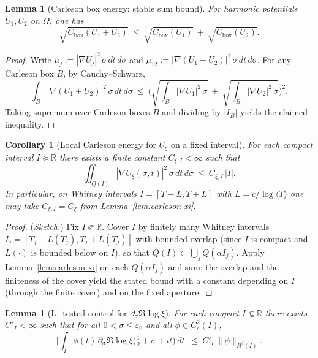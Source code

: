 \documentclass[11pt]{article}
\newtheorem{lemma}[theorem]{Lemma}
\newtheorem{corollary}[theorem]{Corollary}
\theoremstyle{definition}
\theoremstyle{remark}
\theoremstyle{definition}
\newcommand{\R}{\mathbb{R}}
\begin{document}
\bigskip

\begin{lemma}[Carleson box energy: stable sum bound]\label{lem:carleson-sum}
For harmonic potentials $U_1,U_2$ on $\Omega$, one has
\[
\sqrt{C_{\mathrm{box}}(U_1+U_2)}\ \le\
\sqrt{C_{\mathrm{box}}(U_1)}\ +\ \sqrt{C_{\mathrm{box}}(U_2)}.
\]
\end{lemma}
\begin{proof}
Write $\mu_j:=|\nabla U_j|^2\,\sigma\,dt\,d\sigma$ and $\mu_{12}:=|\nabla(U_1{+}U_2)|^2\,\sigma\,dt\,d\sigma$. For any Carleson box $B$, by Cauchy–Schwarz,
\[
\int_{B} |\nabla(U_1+U_2)|^2\,\sigma\,dt\,d\sigma
\ \le\ \Big(\sqrt{\int_B |\nabla U_1|^2\,\sigma}\ +\ \sqrt{\int_B |\nabla U_2|^2\,\sigma}\Big)^{\!2}.
\]
Taking supremum over Carleson boxes $B$ and dividing by $|I_B|$ yields the claimed inequality.
\end{proof}

\begin{corollary}[Local Carleson energy for $U_\xi$ on a fixed interval]\label{cor:xi-carleson-all-I}
For each compact interval $I\Subset\R$ there exists a finite constant $C_{\xi,I}<\infty$ such that
\[
  \iint_{Q(I)} |\nabla U_{\xi}(\sigma,t)|^2\,\sigma\,dt\,d\sigma\ \le\ C_{\xi,I}\,|I|.
\]
In particular, on Whitney intervals $I=[T-L,T+L]$ with $L=c/\log\langle T\rangle$ one may take $C_{\xi,I}=C_\xi$ from Lemma~\ref{lem:carleson-xi}.
\end{corollary}
\begin{proof}
(\emph{Sketch.}) Fix $I\Subset\R$. Cover $I$ by finitely many Whitney intervals $I_j=[T_j-L(T_j),T_j+L(T_j)]$ with bounded overlap (since $I$ is compact and $L(\cdot)$ is bounded below on $I$), so that $Q(I)\subset\bigcup_j Q(\alpha I_j)$. Apply Lemma~\ref{lem:carleson-xi} on each $Q(\alpha I_j)$ and sum; the overlap and the finiteness of the cover yield the stated bound with a constant depending on $I$ (through the finite cover) and on the fixed aperture.
\end{proof}

\begin{lemma}[L$^1$-tested control for $\partial_\sigma\Re\log\xi$]\label{lem:xi-deriv-L1}
For each compact $I\Subset\R$ there exists $C'_I<\infty$ such that for all $0<\sigma\le\varepsilon_0$ and all $\phi\in C_c^2(I)$,
\[
\Big|\int_I \phi(t)\,\partial_\sigma\Re\log\xi\!\big(\tfrac12+\sigma+it\big)\,dt\Big|
\ \le\ C'_I\,\|\phi\|_{H^1(I)}.
\]
\end{lemma}
\end{document}
